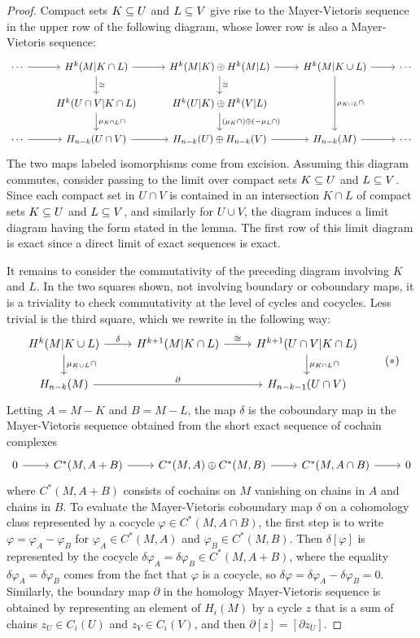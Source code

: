 \begin{proof}
Compact sets $K\subseteq U$ and $L\subseteq V$ give rise to the Mayer-Vietoris sequence in the upper row of the following diagram, whose lower row is also a Mayer-Vietoris sequence:
\[\begin{tikzcd}
\cdots\ar[r]&H^k(M|K\cap L)\ar[r]\ar[d,"\cong"]&H^k(M|K)\oplus H^k(M|L)\ar[r]\ar[d,"\cong"]&H^k(M|K\cup L)\ar[r]\ar[dd,"\mu_{K\cup L}\cap"]&\cdots\\
&H^k(U\cap V|K\cap L)\ar[d,"\mu_{K\cap L}\cap"]&H^k(U|K)\oplus H^k(V|L)\ar[d,"(\mu_K\cap)\oplus(-\mu_L\cap)"]&&\\
\cdots\ar[r]&H_{n-k}(U\cap V)\ar[r]&H_{n-k}(U)\oplus H_{n-k}(V)\ar[r]&H_{n-k}(M)\ar[r]&\cdots
\end{tikzcd}\]
The two maps labeled isomorphisms come from excision. Assuming this diagram
commutes, consider passing to the limit over compact sets $K\subseteq U$ and $L\subseteq V$. Since each compact set in $U\cap V$ is contained in an intersection $K\cap L$ of compact sets $K\subseteq U$ and $L\subseteq V$, and similarly for $U\cup V$, the diagram induces a limit diagram having the form stated in the lemma. The first row of this limit diagram is exact since a direct limit of exact sequences is exact.\par
It remains to consider the commutativity of the preceding diagram involving $K$ and $L$. In the two squares shown, not involving boundary or coboundary maps, it is a triviality to check commutativity at the level of cycles and cocycles. Less trivial is the third square, which we rewrite in the following way:
\begin{equation}
\begin{tikzcd}
H^k(M|K\cup L)\ar[r,"\delta"]\ar[d,"\mu_{K\cup L}\cap"]&H^{k+1}(M|K\cap L)\ar[r,"\cong"]&H^{k+1}(U\cap V|K\cap L)\ar[d,"\mu_{K\cap L}\cap"]\\
H_{n-k}(M)\ar[rr,"\partial"]&&H_{n-k-1}(U\cap V)
\end{tikzcd}
\tag{$\ast$}
\end{equation}
Letting $A=M-K$ and $B=M-L$, the map $\delta$ is the coboundary map in the Mayer-Vietoris sequence obtained from the short exact sequence of cochain complexes
\[\begin{tikzcd}
0\ar[r]&C^*(M,A+B)\ar[r]&C^*(M,A)\oplus C^*(M,B)\ar[r]&C^*(M,A\cap B)\ar[r]&0
\end{tikzcd}\]
where $C^*(M,A+B)$ consists of cochains on $M$ vanishing on chains in $A$ and chains in $B$. To evaluate the Mayer-Vietoris coboundary map $\delta$ on a cohomology class represented by a cocycle $\varphi\in C^*(M,A\cap B)$, the first step is to write $\varphi=\varphi_A-\varphi_B$ for $\varphi_A\in C^*(M,A)$ and $\varphi_B\in C^*(M,B)$. Then $\delta[\varphi]$ is represented by the cocycle $\delta\varphi_A=\delta\varphi_B\in C^*(M,A+B)$, where the equality $\delta\varphi_A=\delta\varphi_B$ comes from the fact that $\varphi$ is a cocycle, so $\delta\varphi=\delta\varphi_A-\delta\varphi_B=0$. Similarly, the boundary map $\partial$ in the homology Mayer-Vietoris sequence is obtained by representing an element of $H_i(M)$ by a cycle $z$ that is a sum of chains $z_U\in C_i(U)$ and $z_V\in C_i(V)$, and then $\partial[z]=[\partial z_U]$.\par

\end{proof}
